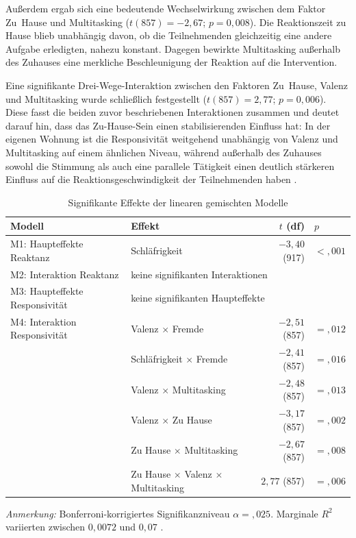 \documentclass[11pt,a4paper]{article}
\begin{document}
Außerdem ergab sich eine bedeutende Wechselwirkung zwischen dem Faktor Zu~Hause und
Multitasking ($t(857)=-2{,}67$; $p=0{,}008$). Die Reaktionszeit zu Hause blieb unabhängig
davon, ob die Teilnehmenden gleichzeitig eine andere Aufgabe erledigten, nahezu konstant.
Dagegen bewirkte Multitasking außerhalb des Zuhauses eine merkliche Beschleunigung der
Reaktion auf die Intervention.

Eine signifikante Drei-Wege-Interaktion zwischen den Faktoren Zu~Hause, Valenz und
Multitasking wurde schließlich festgestellt ($t(857)=2{,}77$; $p=0{,}006$). Diese fasst die
beiden zuvor beschriebenen Interaktionen zusammen und deutet darauf hin, dass das
Zu-Hause-Sein einen stabilisierenden Einfluss hat: In der eigenen Wohnung ist die
Responsivität weitgehend unabhängig von Valenz und Multitasking auf einem ähnlichen Niveau,
während außerhalb des Zuhauses sowohl die Stimmung als auch eine parallele Tätigkeit einen
deutlich stärkeren Einfluss auf die Reaktionsgeschwindigkeit der Teilnehmenden haben
\citep{meinhardt2025scrolling}.

\begin{table}[htbp]
  \centering
  \caption{Signifikante Effekte der linearen gemischten Modelle}
  \label{tab:lmm-results}
  \begin{tabular}{@{}llrl@{}}
    \toprule
    Modell & Effekt & $t$ (df) & $p$ \\
    \midrule
    M1: Haupteffekte Reaktanz      & Schläfrigkeit                          & $-3{,}40$ (917) & $< {,}001$ \\
    M2: Interaktion Reaktanz       & \multicolumn{3}{l}{keine signifikanten Interaktionen} \\
    M3: Haupteffekte Responsivität & \multicolumn{3}{l}{keine signifikanten Haupteffekte} \\
    M4: Interaktion Responsivität  & Valenz $\times$ Fremde                 & $-2{,}51$ (857) & $= {,}012$ \\
                                    & Schläfrigkeit $\times$ Fremde          & $-2{,}41$ (857) & $= {,}016$ \\
                                    & Valenz $\times$ Multitasking           & $-2{,}48$ (857) & $= {,}013$ \\
                                    & Valenz $\times$ Zu Hause               & $-3{,}17$ (857) & $= {,}002$ \\
                                    & Zu Hause $\times$ Multitasking         & $-2{,}67$ (857) & $= {,}008$ \\
                                    & Zu Hause $\times$ Valenz $\times$ Multitasking & $2{,}77$ (857) & $= {,}006$ \\
    \bottomrule
  \end{tabular}
  \begin{minipage}{0.9\textwidth}
    \footnotesize\vspace{2mm}
    \emph{Anmerkung:} Bonferroni-korrigiertes Signifikanzniveau $\alpha = {,}025$. Marginale
    $R^2$ variierten zwischen $0{,}0072$ und $0{,}07$ \citep{meinhardt2025scrolling}.
  \end{minipage}
\end{table}
\end{document}
